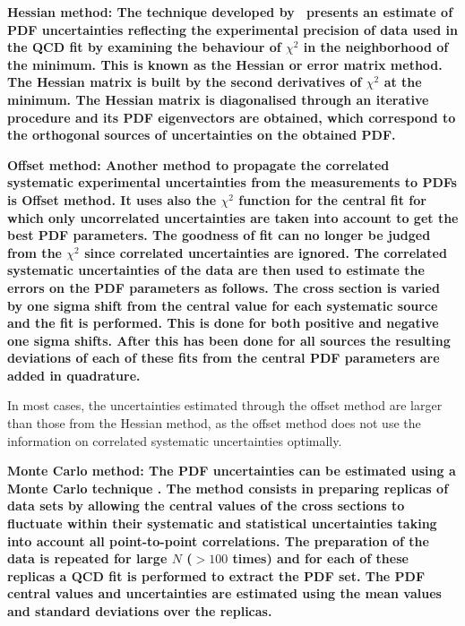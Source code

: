 \begin{description}
\item \bf{Hessian method:} \rm
The technique developed by~\cite{Pumplin:2001ct} presents an estimate of PDF uncertainties 
reflecting the experimental precision of data used in the QCD fit by examining the behaviour 
of $\chi^2$ 
in the neighborhood of the minimum. 
This is known as the Hessian or error matrix method. 
The Hessian matrix is built by the second derivatives of $\chi^2$ at the minimum. 
%
The Hessian matrix is diagonalised through an iterative procedure and its PDF eigenvectors
are obtained, which correspond to the orthogonal sources of uncertainties on the obtained PDF.

\item \bf{Offset  method:} \rm
Another method to propagate the correlated systematic experimental uncertainties from 
the measurements to PDFs \cite{Botje:2001fx} is Offset method.
%
It uses also the $\chi^2$ function for the central fit for which only
uncorrelated uncertainties are taken into account to get the best PDF parameters. The goodness of fit can no longer be judged from the $\chi^2$ since correlated uncertainties are ignored. 
%
The correlated systematic uncertainties of the data are then used to estimate 
the errors on the PDF parameters as follows.
The cross section is varied by one sigma shift from the central value 
for each systematic source and the fit is performed. 
This is done for both positive and negative one sigma shifts. 
After this has been done for all sources the 
resulting deviations of each of these fits from the central PDF parameters are added in quadrature. 

In most cases, the uncertainties estimated through the offset method are larger than 
those from the Hessian method, as the offset method does not use the information on correlated systematic uncertainties optimally.

\item \bf{Monte Carlo method:} \rm
The PDF uncertainties can be estimated using a Monte Carlo technique \cite{Giele:1998gw, mcmethod2}.
The method consists in preparing replicas of data sets by allowing the central values of the cross sections to 
fluctuate within their systematic and statistical uncertainties taking into account all point-to-point correlations.
The preparation of the data is repeated for large $N$ ($>100$ times) and for each of these replicas a QCD fit is performed to 
extract the PDF set. The PDF central values and uncertainties are estimated using the mean values and standard deviations
over the replicas. 


\end{description}
